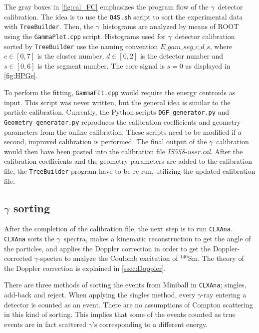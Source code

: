 \documentclass[twoside,english]{uiofysmaster/uiofysmaster}
\newcommand{\Sm}{$^{140}$Sm} %
\newcommand{\ga}{$\gamma$}
\let\orgautoref\autoref
\renewcommand{\autoref}
        {%
		 \def\sectionautorefname{Section}%
		 \def\subsectionautorefname{Section}%
		 \def\subsubsectionautorefname{Section}%
		 \def\chapterautorefname{Chapter}%
          \orgautoref}
\begin{document}
The gray boxes in \autoref{fig:cal_FC} emphasizes the program flow of the \ga\ detector calibration. 
The idea is to use the \texttt{Q4S.sh} script to sort the experimental data with \texttt{TreeBuilder}.
Then, the \ga\ histograms are analyzed by means of ROOT using the \texttt{GammaPlot.cpp} script.
Histograms used for \ga\ detector calibration sorted by \texttt{TreeBuilder} use the naming convention $\textit{E\_gam\_seg}\_c\_d\_s$, where $c \in [0, 7]$ is the cluster number, $d \in [0, 2]$ is the detector number and $s \in [0, 6]$ is the segment number.
The core signal is $s = 0$ as displayed in \autoref{fig:HPGe}.

To perform the fitting, \texttt{GammaFit.cpp} would require the energy centroids as input. 
This script was never written, but the general idea is similar to the particle calibration.
Currently, the Python scripts \texttt{DGF\_generator.py} and \texttt{Geometry\_generator.py} reproduces the calibration coefficients and geometry parameters from the online calibration. 
These scripts need to be modified if a second, improved calibration is performed.
The final output of the \ga\ calibration would then have been pasted into the calibration file \textit{IS558-user.cal}.
After the calibration coefficients and the geometry parameters are added to the calibration file, the \texttt{TreeBuilder} program have to be re-run, utilizing the updated calibration file.



\subsection{\texorpdfstring{$\gamma$}{gamma} sorting}
After the completion of the calibration file, the next step is to run \texttt{CLXAna}.
\texttt{CLXAna} sorts the \ga\ spectra, makes a kinematic reconstruction to get the angle of the particles, and applies the Doppler correction in order to get the Doppler-corrected \ga-spectra to analyze the Coulomb excitation of \Sm.
The theory of the Doppler correction is explained in \autoref{ssec:Doppler}.

There are three methods of sorting the events from Miniball in \texttt{CLXAna}; singles, add-back and reject. 
When applying the singles method, every \ga-ray entering a detector is counted as an event.
There are no assumptions of Compton scattering in this kind of sorting. 
This implies that some of the events counted as true events are in fact scattered \ga's corresponding to a different energy.
\end{document}

